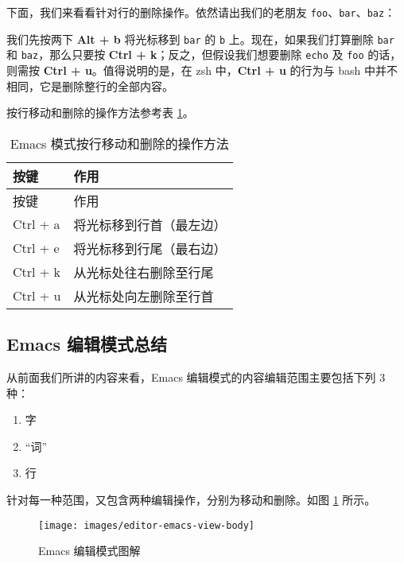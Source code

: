 \documentclass[]{ctexbook}
\newenvironment{Shaded}{\begin{snugshade}}{\end{snugshade}}
\newcommand{\ExtensionTok}[1]{#1}
\newcommand{\NormalTok}[1]{#1}
\providecommand{\tightlist}{%
  \setlength{\itemsep}{0pt}\setlength{\parskip}{0pt}}
\begin{document}
下面，我们来看看针对行的删除操作。依然请出我们的老朋友 \texttt{foo}、\texttt{bar}、\texttt{baz}：

\begin{Shaded}
\end{Shaded}

我们先按两下 \textbf{Alt + b} 将光标移到 \texttt{bar} 的 \texttt{b} 上。现在，如果我们打算删除 \texttt{bar} 和 \texttt{baz}，那么只要按 \textbf{Ctrl + k}；反之，但假设我们想要删除 \texttt{echo} 及 \texttt{foo} 的话，则需按 \textbf{Ctrl + u}。值得说明的是，在 zsh 中，\textbf{Ctrl + u} 的行为与 bash 中并不相同，它是删除整行的全部内容。

按行移动和删除的操作方法参考表 \ref{tab:emacs-line}。

\begin{longtable}[]{@{}ll@{}}
\caption{\label{tab:emacs-line} Emacs 模式按行移动和删除的操作方法}\tabularnewline
\toprule
按键 & 作用\tabularnewline
\midrule
\endfirsthead
\toprule
按键 & 作用\tabularnewline
\midrule
\endhead
Ctrl + a & 将光标移到行首（最左边）\tabularnewline
Ctrl + e & 将光标移到行尾（最右边）\tabularnewline
Ctrl + k & 从光标处往右删除至行尾\tabularnewline
Ctrl + u & 从光标处向左删除至行首\tabularnewline
\bottomrule
\end{longtable}

\hypertarget{emacs-ux7f16ux8f91ux6a21ux5f0fux603bux7ed3}{%
\subsection{Emacs 编辑模式总结}\label{emacs-ux7f16ux8f91ux6a21ux5f0fux603bux7ed3}}

从前面我们所讲的内容来看，Emacs 编辑模式的内容编辑范围主要包括下列 3 种：

\begin{enumerate}
\def\labelenumi{\arabic{enumi}.}
\tightlist
\item
  字
\item
  ``词''
\item
  行
\end{enumerate}

针对每一种范围，又包含两种编辑操作，分别为移动和删除。如图 \ref{fig:emacs-mode} 所示。

\begin{figure}
\texttt{[image: images/editor-emacs-view-body]} \caption{Emacs 编辑模式图解}\label{fig:emacs-mode}
\end{figure}
\end{document}

